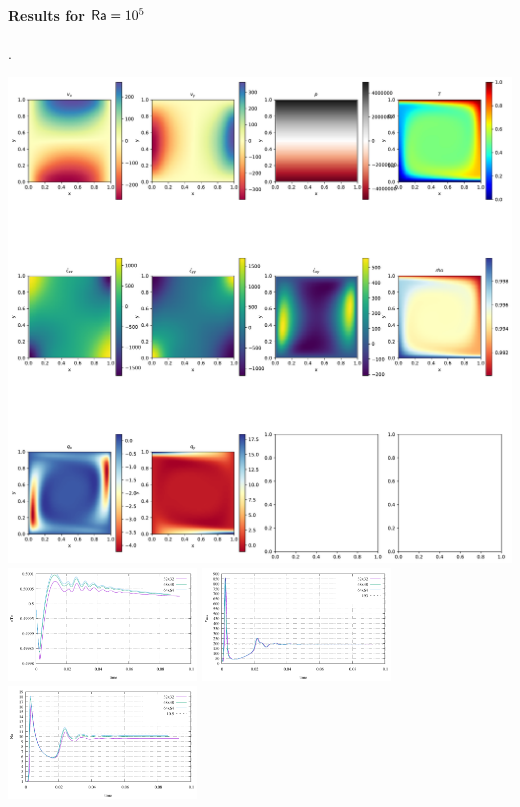 \paragraph{Results for ${\mathsf{Ra}}=10^5$}.
\begin{center}
\includegraphics[width=16cm]{python_codes/fieldstone_03/results_1e5/64x64/solution.pdf}\\
\includegraphics[width=5cm]{python_codes/fieldstone_03/results_1e5/Tavrg.pdf}
\includegraphics[width=5cm]{python_codes/fieldstone_03/results_1e5/vrms.pdf}\\
\includegraphics[width=5cm]{python_codes/fieldstone_03/results_1e5/Nu.pdf}

\end{center}

